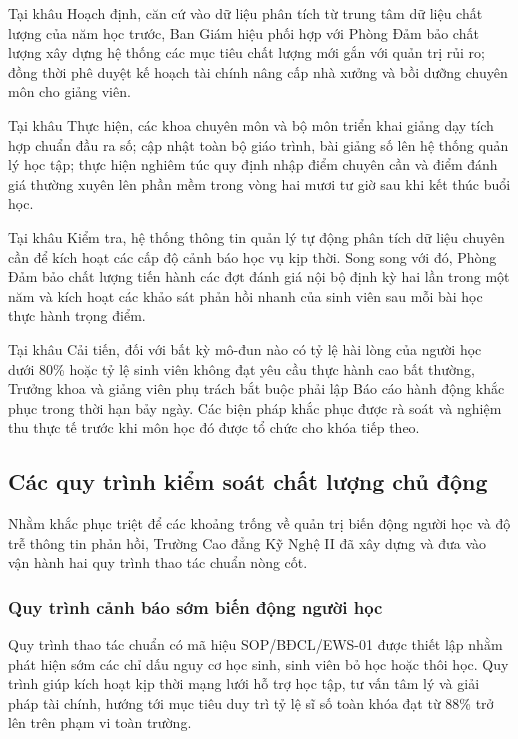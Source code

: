 Tại khâu Hoạch định, căn cứ vào dữ liệu phân tích từ trung tâm dữ liệu chất lượng của năm học trước, Ban Giám hiệu phối hợp với Phòng Đảm bảo chất lượng xây dựng hệ thống các mục tiêu chất lượng mới gắn với quản trị rủi ro; đồng thời phê duyệt kế hoạch tài chính nâng cấp nhà xưởng và bồi dưỡng chuyên môn cho giảng viên.

Tại khâu Thực hiện, các khoa chuyên môn và bộ môn triển khai giảng dạy tích hợp chuẩn đầu ra số; cập nhật toàn bộ giáo trình, bài giảng số lên hệ thống quản lý học tập; thực hiện nghiêm túc quy định nhập điểm chuyên cần và điểm đánh giá thường xuyên lên phần mềm trong vòng hai mươi tư giờ sau khi kết thúc buổi học.

Tại khâu Kiểm tra, hệ thống thông tin quản lý tự động phân tích dữ liệu chuyên cần để kích hoạt các cấp độ cảnh báo học vụ kịp thời. Song song với đó, Phòng Đảm bảo chất lượng tiến hành các đợt đánh giá nội bộ định kỳ hai lần trong một năm và kích hoạt các khảo sát phản hồi nhanh của sinh viên sau mỗi bài học thực hành trọng điểm.

Tại khâu Cải tiến, đối với bất kỳ mô-đun nào có tỷ lệ hài lòng của người học dưới 80\% hoặc tỷ lệ sinh viên không đạt yêu cầu thực hành cao bất thường, Trưởng khoa và giảng viên phụ trách bắt buộc phải lập Báo cáo hành động khắc phục trong thời hạn bảy ngày. Các biện pháp khắc phục được rà soát và nghiệm thu thực tế trước khi môn học đó được tổ chức cho khóa tiếp theo.

\subsection{Các quy trình kiểm soát chất lượng chủ động}

Nhằm khắc phục triệt để các khoảng trống về quản trị biến động người học và độ trễ thông tin phản hồi, Trường Cao đẳng Kỹ Nghệ II đã xây dựng và đưa vào vận hành hai quy trình thao tác chuẩn nòng cốt.

\subsubsection{Quy trình cảnh báo sớm biến động người học}

Quy trình thao tác chuẩn có mã hiệu SOP/BĐCL/EWS-01 được thiết lập nhằm phát hiện sớm các chỉ dấu nguy cơ học sinh, sinh viên bỏ học hoặc thôi học. Quy trình giúp kích hoạt kịp thời mạng lưới hỗ trợ học tập, tư vấn tâm lý và giải pháp tài chính, hướng tới mục tiêu duy trì tỷ lệ sĩ số toàn khóa đạt từ 88\% trở lên trên phạm vi toàn trường.

